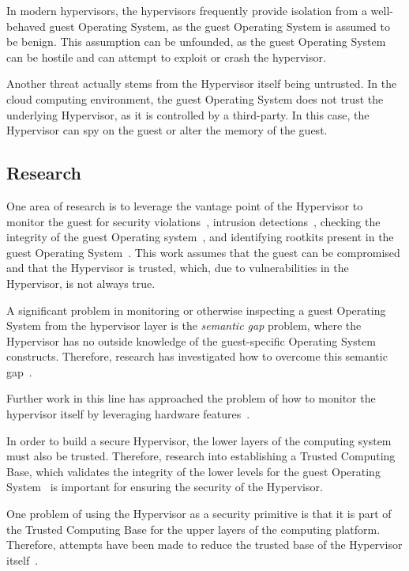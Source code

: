 \documentclass[11pt,letterpaper]{article}
\begin{document}
In modern hypervisors, the hypervisors frequently provide isolation
from a well-behaved guest Operating System, as the guest Operating
System is assumed to be benign. This assumption can be unfounded, as
the guest Operating System can be hostile and can attempt to exploit
or crash the hypervisor. 

Another threat actually stems from the Hypervisor itself being
untrusted. In the cloud computing environment, the guest Operating
System does not trust the underlying Hypervisor, as it is controlled
by a third-party. In this case, the Hypervisor can spy on the guest
or alter the memory of the guest.

\subsection{Research}

One area of research is to leverage the vantage point of the
Hypervisor to monitor the guest for security
violations~\cite{Karger1991, Barham2003}, intrusion
detections~\cite{Dunlap2002, Garfinkel2003a, Kourai2005, Chen2008,
  Garfinkel2003b}, checking the integrity of the guest Operating
system~\cite{Seshadri2006, McCune2010}, and identifying rootkits present
in the guest Operating System~\cite{Jones2008, Grace2010}. This work
assumes that the guest can be compromised and that the Hypervisor is
trusted, which, due to vulnerabilities in the Hypervisor, is not
always true.

A significant problem in monitoring or otherwise inspecting a guest
Operating System from the hypervisor layer is the \emph{semantic gap}
problem, where the Hypervisor has no outside knowledge of the
guest-specific Operating System constructs. Therefore, research has
investigated how to overcome this semantic gap~\cite{Jones2006,
  Christodorescu2009, Srinivasan2011}.

Further work in this line has approached the problem of how to monitor
the hypervisor itself by leveraging hardware features~\cite{Azab2010}.

In order to build a secure Hypervisor, the lower layers of the
computing system must also be trusted. Therefore, research into
establishing a Trusted Computing Base, which validates the integrity
of the lower levels for the guest Operating System~\cite{Arbaugh1997,
  Sailer2004, Singaravelu2006} is important for ensuring the security
of the Hypervisor.

One problem of using the Hypervisor as a security primitive is that it
is part of the Trusted Computing Base for the upper layers of the
computing platform. Therefore, attempts have been made to reduce the
trusted base of the Hypervisor itself~\cite{Murray2008, Shinagawa2009,
  Colp2011, Wang2012}.
\end{document}
